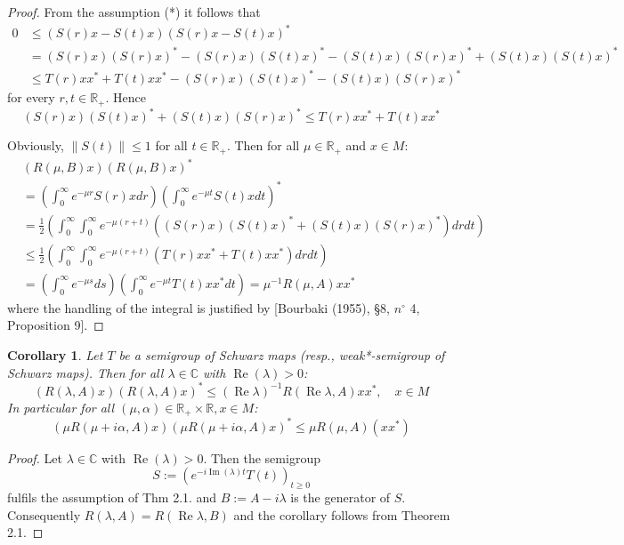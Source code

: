 \documentclass[a4paper, fontsize=11pt, oneside]{scrbook}
\newtheorem{corollary}[theorem]{Corollary}
\begin{document}
\begin{proof}
From the assumption (*) it follows that
\begin{align*}
0 &\leq (S(r)x - S(t)x)(S(r)x - S(t)x)^{*} \\
&= (S(r)x)(S(r)x)^{*} - (S(r)x)(S(t)x)^{*} - (S(t)x)(S(r)x)^{*} + (S(t)x)(S(t)x)^{*} \\
&\leq T(r)xx^{*} + T(t)xx^{*} - (S(r)x)(S(t)x)^{*} - (S(t)x)(S(r)x)^{*}
\end{align*}
for every $r,t \in \mathbb{R}_{+}$.
Hence
\[
(S(r)x)(S(t)x)^{*} + (S(t)x)(S(r)x)^{*} \leq T(r)xx^{*} + T(t)xx^{*}
\]

Obviously, $\|S(t)\| \leq 1$ for all $t \in \mathbb{R}_{+}$.
Then for all $\mu \in \mathbb{R}_{+}$ and $x \in M$:
\begin{align*}
&(R(\mu, B)x)(R(\mu, B)x)^{*} \\
&= \left(\int_{0}^{\infty} e^{-\mu r} S(r)x dr\right)\left(\int_{0}^{\infty} e^{-\mu t} S(t)x dt\right)^{*} \\
&= \frac{1}{2}\left(\int_{0}^{\infty} \int_{0}^{\infty} e^{-\mu(r+t)}((S(r)x)(S(t)x)^{*} + (S(t)x)(S(r)x)^{*}) dr dt\right) \\
&\leq \frac{1}{2}\left(\int_{0}^{\infty} \int_{0}^{\infty} e^{-\mu(r+t)}(T(r)xx^{*} + T(t)xx^{*}) dr dt\right) \\
&= \left(\int_{0}^{\infty} e^{-\mu s} ds\right)\left(\int_{0}^{\infty} e^{-\mu t} T(t)xx^{*} dt\right) = \mu^{-1} R(\mu, A)xx^{*}
\end{align*}
where the handling of the integral is justified by [Bourbaki (1955), §8, $n^{\circ}$ 4, Proposition 9].
\end{proof}

\begin{corollary} 
Let $T$ be a semigroup of Schwarz maps (resp., weak*-semigroup of Schwarz maps).
Then for all $\lambda \in \mathbb{C}$ with $\operatorname{Re}(\lambda)>0$:
\[
(R(\lambda, A)x)(R(\lambda, A)x)^{*} \leq (\operatorname{Re}\lambda)^{-1} R(\operatorname{Re}\lambda, A)xx^{*}, \quad x \in M
\]
In particular for all $(\mu, \alpha) \in \mathbb{R}_{+} \times \mathbb{R}, x \in M$:
\[
(\mu R(\mu+i\alpha, A)x)(\mu R(\mu+i\alpha, A)x)^{*} \leq \mu R(\mu, A)(xx^{*})
\]
\end{corollary}

\begin{proof}
Let $\lambda \in \mathbb{C}$ with $\operatorname{Re}(\lambda)>0$.
Then the semigroup
\[
S := (e^{-i\operatorname{Im}(\lambda)t}T(t))_{t \geq 0}
\]
fulfils the assumption of Thm 2.1. and $B := A-i\lambda$ is the generator of $S$.
Consequently $R(\lambda, A)=R(\operatorname{Re}\lambda, B)$ and the corollary follows from Theorem 2.1.
\end{proof}
\end{document}

